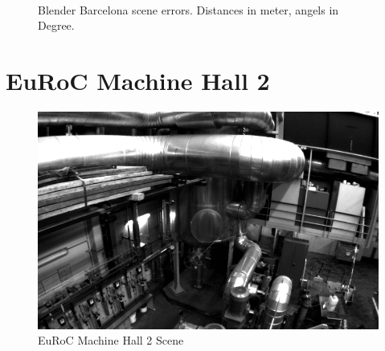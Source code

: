 \documentclass[11pt,a4paper,titlepage,oneside]{report}
\begin{document}
\begin{figure}[H]
  \\
  \caption{Blender Barcelona scene errors. Distances in meter, angels in Degree.}\label{fig:blender_barcelona_diff}
\end{figure}

\section{EuRoC Machine Hall 2}

\begin{figure}[H]
  \includegraphics[width=1.0\textwidth]{img/euroc_scene.png}
  \caption{EuRoC Machine Hall 2 Scene}\label{fig:euroc_scene}
\end{figure}
\end{document}
